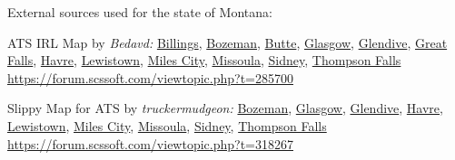
















\vspace{2em}\footnoterule
{\footnotesize \noindent External sources used for the state of Montana:
\begin{description}[
	style=nextline,
	leftmargin=1.1em,
	labelsep=0pt,
	parsep=0pt,
	font=\normalfont,
]

\item[$\ast$]
ATS IRL Map by \textit{Bedavd:}
\hyperref[city:Billings]{Billings},
\hyperref[city:Bozeman]{Bozeman},
\hyperref[city:Butte]{Butte},
\hyperref[city:Glasgow]{Glasgow},
\hyperref[city:Glendive]{Glendive},
\hyperref[city:Great Falls]{Great Falls},
\hyperref[city:Havre]{Havre},
\hyperref[city:Lewistown]{Lewistown},
\hyperref[city:Miles City]{Miles City},
\hyperref[city:Missoula]{Missoula},
\hyperref[city:Sidney]{Sidney},
\hyperref[city:Thompson Falls]{Thompson Falls}
\\ \url{https://forum.scssoft.com/viewtopic.php?t=285700}

\item[$\dagger$]
Slippy Map for ATS by \textit{truckermudgeon:}
\hyperref[city:Bozeman]{Bozeman},
\hyperref[city:Glasgow]{Glasgow},
\hyperref[city:Glendive]{Glendive},
\hyperref[city:Havre]{Havre},
\hyperref[city:Lewistown]{Lewistown},
\hyperref[city:Miles City]{Miles City},
\hyperref[city:Missoula]{Missoula},
\hyperref[city:Sidney]{Sidney},
\hyperref[city:Thompson Falls]{Thompson Falls}
\\ \url{https://forum.scssoft.com/viewtopic.php?t=318267}

\end{description}
}
